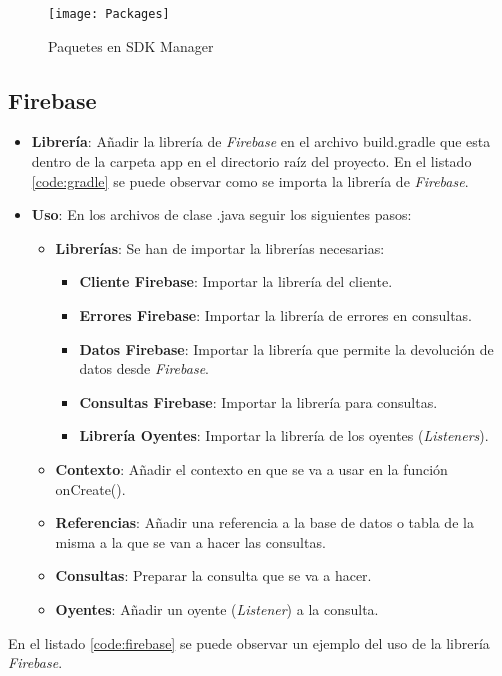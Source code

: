 	\begin{figure}[h !]
		\centering
		\texttt{[image: Packages]}
		\caption{Paquetes en SDK Manager}
		\label{fig:SdkManagerPackages}
	\end{figure}
	
	\newpage
	\subsection{Firebase}
	\begin{itemize}
		\item {\bf Librería}: Añadir la librería de {\it Firebase} en el archivo {\ttfamily build.gradle} que esta dentro de la carpeta {\ttfamily app} en el directorio raíz del proyecto. En el listado \ref{code:gradle} se puede observar como se importa la librería de {\it Firebase}.
		
		
		
		\item {\bf Uso}: En los archivos de clase {\ttfamily .java}\cite{14:java:online} seguir los siguientes pasos:
		\begin{itemize}
			\item {\bf Librerías}: Se han de importar la librerías necesarias:
			\begin{itemize}
				\item {\bf Cliente Firebase}: Importar la librería del cliente.
				\item {\bf Errores Firebase}: Importar la librería de errores en consultas.
				\item {\bf Datos Firebase}: Importar la librería que permite la devolución de datos desde {\it Firebase}.
				\item {\bf Consultas Firebase}: Importar la librería para consultas.
				\item {\bf Librería Oyentes}: Importar la librería de los oyentes ({\it Listeners}).
			\end{itemize}
			\item {\bf Contexto}: Añadir el contexto en que se va a usar en la función {\ttfamily onCreate()}.
			\item {\bf Referencias}: Añadir una referencia a la base de datos o tabla de la misma a la que se van a hacer las consultas.
			\item {\bf Consultas}: Preparar la consulta que se va a hacer.
			\item {\bf Oyentes}: Añadir un oyente ({\it Listener}) a la consulta.
		\end{itemize}
	\end{itemize}

	En el listado \ref{code:firebase} se puede observar un ejemplo del uso de la librería {\it Firebase}.
	
	
